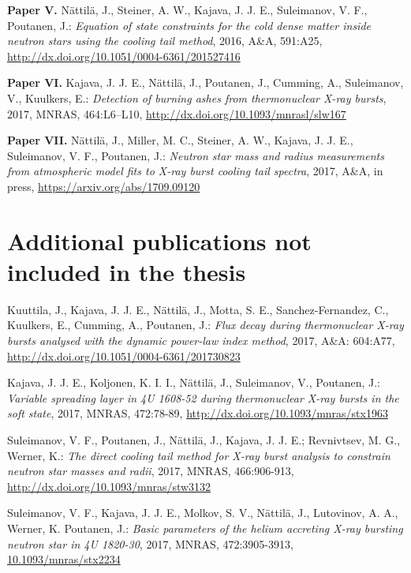 \hspace{15pt}\textbf{Paper V.} Nättilä, J., Steiner, A. W., Kajava, J. J. E., Suleimanov, V. F., Poutanen, J.: 
\textit{Equation of state constraints for the cold dense matter inside neutron stars using the cooling tail method}, 
2016, A\&A, 591:A25, 
\url{http://dx.doi.org/10.1051/0004-6361/201527416}
 
\vspace{0.3cm}
\textbf{Paper VI.} Kajava, J. J. E., Nättilä, J., Poutanen, J., Cumming, A., Suleimanov, V., Kuulkers, E.: 
\textit{Detection of burning ashes from thermonuclear X-ray bursts}, 
2017, MNRAS, 464:L6–L10, 
\url{http://dx.doi.org/10.1093/mnrasl/slw167}

\vspace{0.3cm}
\textbf{Paper VII.} Nättilä, J., Miller, M. C., Steiner, A. W., Kajava, J. J. E., Suleimanov, V. F., Poutanen, J.: 
\textit{Neutron star mass and radius measurements from atmospheric model fits to X-ray burst cooling tail spectra}, 
2017, A\&A, in press, 
\url{https://arxiv.org/abs/1709.09120}




\newpage
\section*{Additional publications not included in the thesis}

\vspace{0.3cm}
\hspace{15pt} Kuuttila, J., Kajava, J. J. E., Nättilä, J., Motta, S. E., Sanchez-Fernandez, C., Kuulkers, E., Cumming, A., Poutanen, J.: 
\textit{Flux decay during thermonuclear X-ray bursts analysed with the dynamic power-law index method}, 
2017, A\&A: 604:A77, 
\url{http://dx.doi.org/10.1051/0004-6361/201730823}
 

\vspace{0.3cm}
 Kajava, J. J. E., Koljonen, K. I. I., Nättilä, J., Suleimanov, V., Poutanen, J.: 
\textit{Variable spreading layer in 4U 1608-52 during thermonuclear X-ray bursts in the soft state}, 2017, 
MNRAS, 472:78-89, 
\url{http://dx.doi.org/10.1093/mnras/stx1963}


\vspace{0.3cm}
 Suleimanov, V. F., Poutanen, J., Nättilä, J., Kajava, J. J. E.; Revnivtsev, M. G., Werner, K.: 
\textit{The direct cooling tail method for X-ray burst analysis to constrain neutron star masses and radii}, 
2017, MNRAS, 466:906-913, 
\url{http://dx.doi.org/10.1093/mnras/stw3132}
 

\vspace{0.3cm}
 Suleimanov, V. F., Kajava, J. J. E., Molkov, S. V., Nättilä, J., Lutovinov, A. A., Werner, K. Poutanen, J.: 
\textit{Basic parameters of the helium accreting X-ray bursting neutron star in 4U 1820-30}, 
2017, MNRAS, 472:3905-3913,
\url{10.1093/mnras/stx2234}

